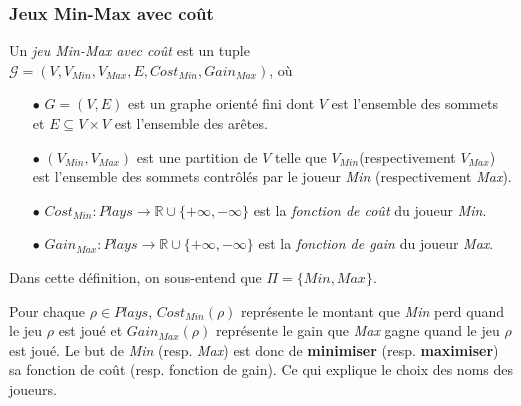 




\subsubsection{Jeux Min-Max avec coût}


\begin{defi} $\text{ }$\\
	
	Un \textit{jeu Min-Max avec coût} est un tuple $\mathcal{G} = (V, V_{Min}, V_{Max}, E, Cost_{Min}, Gain_{Max})$, où
	\begin{enumerate}
		\item[$\bullet$] $G = (V,E)$ est un graphe orienté fini dont $V$ est l'ensemble des sommets et $E \subseteq V\times V$ est l'ensemble des arêtes.
		\item[$\bullet$] $(V_{Min},V_{Max})$ est une partition de $V$ telle que $V_{Min}$(respectivement $V_{Max}$) est l'ensemble des sommets contrôlés par le joueur \textit{Min} (respectivement \textit{Max}).
		\item[$\bullet$] $Cost_{Min}: Plays \rightarrow \mathbb{R} \cup \{+ \infty, -\infty \}$ est la \textit{fonction de coût} du joueur \textit{Min}.
		\item[$\bullet$] $Gain_{Max}: Plays \rightarrow \mathbb{R} \cup \{ + \infty, -\infty \}$ est la \textit{fonction de gain} du joueur \textit{Max}.
	\end{enumerate}
		
\end{defi}

\begin{rem}
	Dans cette définition, on sous-entend que $\Pi = \{ Min, Max \}$.
\end{rem}

Pour chaque $\rho \in Plays$, $Cost_{Min}(\rho)$ représente le montant que \textit{Min} perd quand le jeu $\rho$ est joué et $Gain_{Max}(\rho)$ représente le gain que \textit{Max} gagne quand le jeu $\rho$ est joué.
Le but de \textit{Min} (resp. \textit{Max}) est donc de \textbf{minimiser} (resp. \textbf{maximiser}) sa fonction de coût (resp. fonction de gain). Ce qui explique le choix des noms des joueurs.\\

